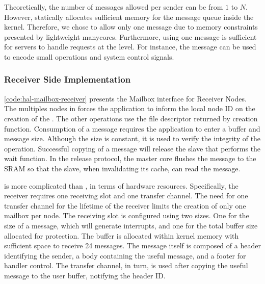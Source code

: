 			Theoretically, the number of messages allowed per sender can be from
			$1$ to $N$. However, \nanvix \hal statically allocates sufficient
			memory for the message queue inside the kernel. Therefore, we chose
			to allow only one message due to memory constraints presented by
			lightweight manycores. Furthermore, using one message is sufficient	for
			servers to handle requests at the \multikernel level. For instance, the
			message can be used to encode small operations and system control signals.
			
			\subsubsection{Receiver Side Implementation}

					\autoref{code:hal-mailbox-receiver} presents the Mailbox interface for
					Receiver Nodes. The multiples nodes in \ioclusters forces the application
					to inform the local node ID on the creation of the \mailbox. The other
					operations use the file descriptor returned by creation function.
					Consumption of a message requires the application to enter a buffer and
					message size. Although the size is constant, it is used to verify the
					integrity of the operation. Successful copying of a message will release
					the slave that performs the wait function. In the release protocol, the
					master core flushes the message to the SRAM so that the slave, when
					invalidating its cache, can read the message.
					
					\mailbox is more complicated than \sync, in terms of hardware resources.
					Specifically, the receiver requires one \dnoc receiving slot and one \cnoc
					transfer channel. The need for one transfer channel for the lifetime
					of the receiver limits the creation of only one mailbox per \noc node.
					The receiving slot is configured using two sizes. One for the size of
					a message, which will generate interrupts, and one for the total buffer
					size allocated for protection. The buffer is allocated within kernel
					memory with sufficient space to receive 24 messages. The message
					itself is composed of a header identifying the sender, a body containing
					the useful message, and a footer for handler control. The transfer channel,
					in turn, is used after copying the useful message to the user buffer,
					notifying the header ID.
					
